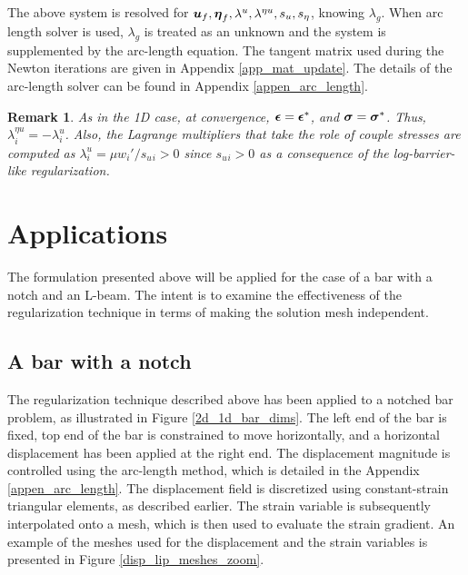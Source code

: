 \documentclass[10pt,review]{cas-sc}
\newtheorem*{remark}{Remark}
\begin{document}
The above system is resolved for $\mbox{\boldmath $u$}_f, \mbox{\boldmath $\eta$}_f, \lambda^u,\lambda^{\eta u},s_u,s_\eta$, knowing $\lambda_g$. When arc length solver is used, $\lambda_g$ is treated as an unknown and the system is supplemented by the arc-length equation. The tangent matrix used during the Newton iterations are given in Appendix \ref{app_mat_update}. The details of the arc-length solver can be found in Appendix \ref{appen_arc_length}.

\begin{remark}
As in the 1D case, at convergence, $\mbox{\boldmath $\epsilon$} = \mbox{\boldmath $\epsilon$}^*$, and $\mbox{\boldmath $\sigma$} = \mbox{\boldmath $\sigma$}^*$. Thus, $\lambda^{\eta u}_i = -\lambda^u_i$. Also, the Lagrange multipliers that take the role of couple stresses are computed as $\lambda^u_i  =  \mu w_i'/ s_u{_i} >0$ since $s_u{_i} >0$ as a consequence of the log-barrier-like regularization.
\end{remark}

\section{Applications}
The formulation presented above will be applied for the case of a bar with a notch and an L-beam. The intent is to examine the effectiveness of the regularization technique in terms of making the solution mesh independent. 


\subsection{A bar with a notch \label{a_bar_with_a_notch}}
The regularization technique described above has been applied to a notched bar problem, as illustrated in Figure \ref{2d_1d_bar_dims}. The left end of the bar is fixed, top end of the bar is constrained to move horizontally, and a horizontal displacement has been applied at the right end. The displacement magnitude is controlled using the arc-length method, which is detailed in the Appendix \ref{appen_arc_length}. The displacement field is discretized using constant-strain triangular elements, as described earlier. The strain variable is subsequently interpolated onto a  mesh, which is then used to evaluate the strain gradient. An example of the meshes used for the displacement and the strain variables is presented in Figure \ref{disp_lip_meshes_zoom}.
\end{document}
